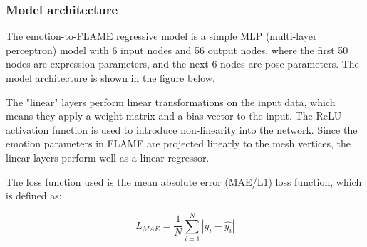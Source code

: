 \subsubsection{Model architecture}

The emotion-to-FLAME regressive model is a simple MLP (multi-layer perceptron) model with 6 input nodes and 56 output nodes, where the first 50 nodes are expression parameters, and the next 6 nodes are pose parameters. The model architecture is shown in the figure below.


The "linear" layers perform linear transformations on the input data, which means they apply a weight matrix and a bias vector to the input. The ReLU activation function is used to introduce non-linearity into the network. Since the emotion parameters in FLAME are projected linearly to the mesh vertices, the linear layers perform well as a linear regressor.

The loss function used is the mean absolute error (MAE/L1) loss function, which is defined as:

\begin{equation}
    L_{MAE} = \frac{1}{N}\sum_{i=1}^{N}|y_i-\hat{y_i}|
\end{equation}
